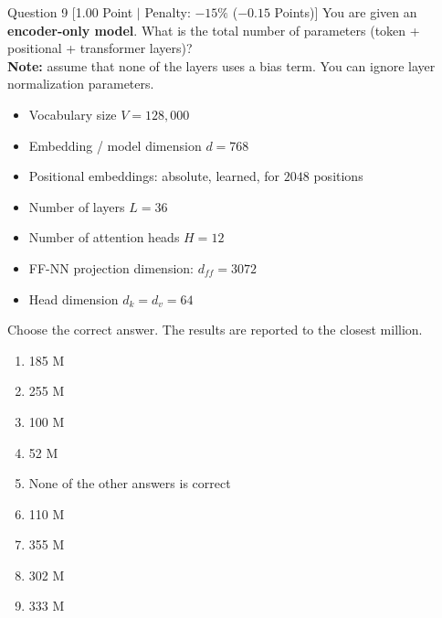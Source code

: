 \documentclass[11pt,a4paper]{article}
\begin{document}
\begin{questionbox}{Question 9 \hfill [1.00 Point $\vert$ Penalty: $-15\%$ ($-0.15$ Points)]}
You are given an \textbf{encoder-only model}. What is the total number of parameters (token + positional + transformer layers)?\\
\textbf{Note:} assume that none of the layers uses a bias term. You can ignore layer normalization parameters.

\begin{itemize}[leftmargin=2em]
    \item Vocabulary size $V = 128,000$
    \item Embedding / model dimension $d = 768$
    \item Positional embeddings: absolute, learned, for $2048$ positions
    \item Number of layers $L = 36$
    \item Number of attention heads $H = 12$
    \item FF-NN projection dimension: $d_{ff} = 3072$
    \item Head dimension $d_k = d_v = 64$
\end{itemize}

Choose the correct answer. The results are reported to the closest million.

\begin{enumerate}[label=\alph*.,leftmargin=2em]
    \item 185 M
    \item 255 M
    \item 100 M
    \item 52 M
    \item None of the other answers is correct
    \item 110 M
    \item 355 M
    \item 302 M
    \item 333 M
\end{enumerate}
\end{questionbox}
\end{document}
